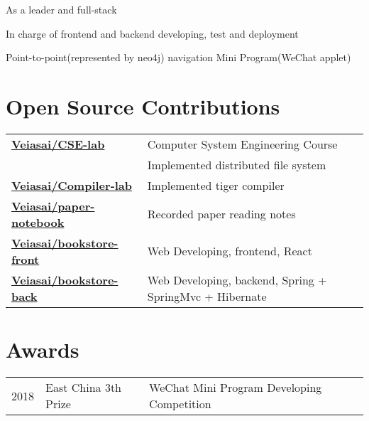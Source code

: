 \documentclass[]{deedy-resume-openfont}
\begin{document}
\begin{minipage}[t]{0.68\textwidth}
\begin{tightemize}
    \item As a leader and full-stack
    \item In charge of frontend and backend developing, test and deployment
    \item Point-to-point(represented by neo4j) navigation Mini Program(WeChat applet)
\end{tightemize}
\sectionsep


\section{Open Source Contributions}
\begin{tabular}{ll}
\href{https://github.com/veiasai/CSE-lab}{\bf Veiasai/CSE-lab} & Computer System Engineering Course \\
& Implemented distributed file system \\
\href{https://github.com/Veiasai/Compiler-lab}{\bf Veiasai/Compiler-lab} & Implemented tiger compiler \\
\href{https://github.com/Veiasai/paper-notebook}{\bf Veiasai/paper-notebook} & Recorded paper reading notes \\
\href{https://github.com/Veiasai/bookstore_front}{\bf Veiasai/bookstore-front} & Web Developing, frontend, React \\
\href{https://github.com/Veiasai/bookstore_back}{\bf Veiasai/bookstore-back} & Web Developing, backend, Spring + SpringMvc + Hibernate \\
\end{tabular}
\sectionsep


\section{Awards} 
\begin{tabular}{rll}
2018         & East China 3th Prize  & WeChat Mini Program Developing Competition \\
\end{tabular}
\sectionsep


% 
% 

\end{minipage} 
\end{document}
